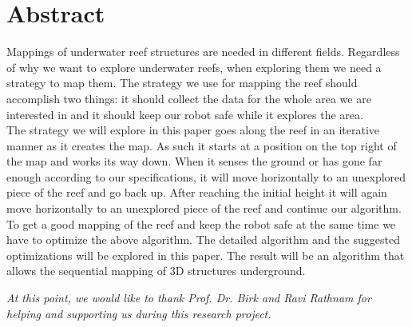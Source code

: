 \documentclass[twoside, 12pt]{article}
\begin{document}
\thispagestyle{fancy} %


 \section*{Abstract}
 \label{sec:abstract}
 
Mappings of underwater reef structures are needed in different fields. Regardless of why we want to explore underwater reefs, when exploring them we need a strategy to map them. The strategy we use for mapping the reef should accomplish two things: it should collect the data for the whole area we are interested in and it should keep our robot safe while it explores the area.\\

The strategy we will explore in this paper goes along the reef in an iterative manner as it creates the map. As such it starts at a position on the top right of the map and works its way down. When it senses the ground or has gone far enough according to our specifications, it will move horizontally to an unexplored piece of the reef and go back up. After reaching the initial height it will again move horizontally to an unexplored piece of the reef and continue our algorithm.\\

To get a good mapping of the reef and keep the robot safe at the same time we have to optimize the above algorithm. The detailed algorithm and the suggested optimizations will be explored in this paper. The result will be an algorithm that allows the sequential mapping of 3D structures underground.\\

\newpage
\tableofcontents

\clearpage

\newpage
\thispagestyle{empty}
\vspace*{\fill}
\begin{center}

\centering

\begin{quoting}
\begin{center}
\noindent
\textit{At this point, we would like to thank Prof. Dr. Birk and Ravi Rathnam for helping and supporting us during this research project.\\}
\end{center}
\end{quoting}

\vspace*{\fill}
\end{center}
\end{document}
